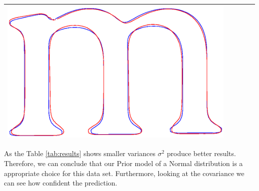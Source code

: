 \documentclass[12pt]{article}
\begin{document}
\begin{center}
\begin{table}[h]
\begin{tabular}{|c|c|c|c|c|}
\includegraphics[scale = 0.2]{images/f3var0_01} \\ \hline
\end{tabular}
\end{table}
\end{center}

As the Table \ref{tab:results} shows smaller variances $\sigma^2$ produce better results.
Therefore, we can conclude that our Prior model of a Normal distribution is a appropriate choice for this data set.
Furthermore, looking at the covariance we can see how confident the prediction.
\end{document}
